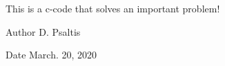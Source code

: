 This is a c-\/code that solves an important problem!

\begin{DoxyAuthor}{Author}
D. Psaltis
\end{DoxyAuthor}
\begin{DoxyDate}{Date}
March. 20, 2020 
\end{DoxyDate}
